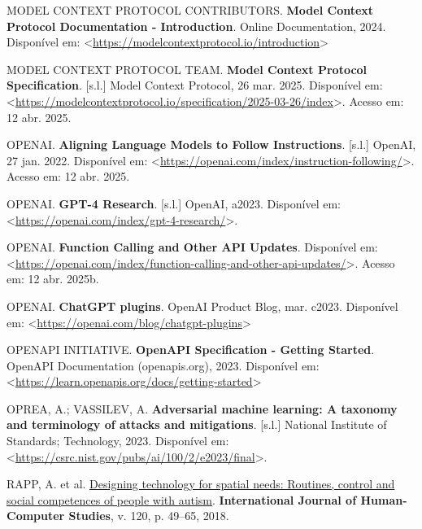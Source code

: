 \documentclass[
]{article}
\newlength{\cslhangindent}
\newenvironment{CSLReferences}[2] %
 {\begin{list}{}{%
  \setlength{\itemindent}{0pt}
  \setlength{\leftmargin}{0pt}
  \setlength{\parsep}{0pt}
  \ifodd #1
   \setlength{\leftmargin}{\cslhangindent}
   \setlength{\itemindent}{-1\cslhangindent}
  \fi
  \setlength{\itemsep}{#2\baselineskip}}}
 {\end{list}}
\begin{document}
\begin{CSLReferences}{0}{1}
MODEL CONTEXT PROTOCOL CONTRIBUTORS. \textbf{{Model Context Protocol
Documentation - Introduction}}. Online Documentation, 2024. Disponível
em:
\textless{}\url{https://modelcontextprotocol.io/introduction}\textgreater{}

MODEL CONTEXT PROTOCOL TEAM. \textbf{Model Context Protocol
Specification}. {[}s.l.{]} Model Context Protocol, 26 mar. 2025.
Disponível em:
\textless{}\url{https://modelcontextprotocol.io/specification/2025-03-26/index}\textgreater.
Acesso em: 12 abr. 2025.

OPENAI. \textbf{Aligning Language Models to Follow Instructions}.
{[}s.l.{]} OpenAI, 27 jan. 2022. Disponível em:
\textless{}\url{https://openai.com/index/instruction-following/}\textgreater.
Acesso em: 12 abr. 2025.

OPENAI. \textbf{GPT-4 Research}. {[}s.l.{]} OpenAI, a2023. Disponível
em:
\textless{}\url{https://openai.com/index/gpt-4-research/}\textgreater.

OPENAI. \textbf{Function Calling and Other API Updates}. Disponível em:
\textless{}\url{https://openai.com/index/function-calling-and-other-api-updates/}\textgreater.
Acesso em: 12 abr. 2025b.

OPENAI. \textbf{{ChatGPT plugins}}. OpenAI Product Blog, mar. c2023.
Disponível em:
\textless{}\url{https://openai.com/blog/chatgpt-plugins}\textgreater{}

OPENAPI INITIATIVE. \textbf{{OpenAPI Specification - Getting Started}}.
OpenAPI Documentation (openapis.org), 2023. Disponível em:
\textless{}\url{https://learn.openapis.org/docs/getting-started}\textgreater{}

OPREA, A.; VASSILEV, A. \textbf{Adversarial machine learning: A taxonomy
and terminology of attacks and mitigations}. {[}s.l.{]} National
Institute of Standards; Technology, 2023. Disponível em:
\textless{}\url{https://csrc.nist.gov/pubs/ai/100/2/e2023/final}\textgreater.

RAPP, A. et al.
\href{https://doi.org/10.1016/j.ijhcs.2018.07.005}{Designing technology
for spatial needs: Routines, control and social competences of people
with autism}. \textbf{International Journal of Human-Computer Studies},
v. 120, p. 49--65, 2018.


\end{CSLReferences}
\end{document}
